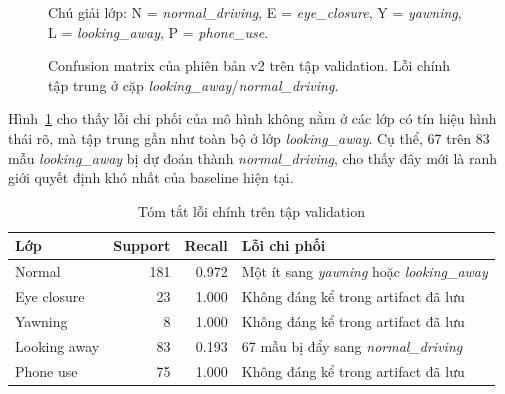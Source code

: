 \documentclass[conference,a4paper]{IEEEtran}
\begin{document}
\begin{figure}[t]
\caption{Confusion matrix của phiên bản v2 trên tập validation. Lỗi chính tập trung ở cặp \textit{looking\_away}/\textit{normal\_driving}.}
\label{fig:confusion-matrix}
\centering
{}

\vspace{0.2em}
{\scriptsize Chú giải lớp: N = \textit{normal\_driving}, E = \textit{eye\_closure}, Y = \textit{yawning}, L = \textit{looking\_away}, P = \textit{phone\_use}.}
\end{figure}

Hình~\ref{fig:confusion-matrix} cho thấy lỗi chi phối của mô hình không nằm ở các lớp có tín hiệu hình thái rõ, mà tập trung gần như toàn bộ ở lớp \textit{looking\_away}. Cụ thể, 67 trên 83 mẫu \textit{looking\_away} bị dự đoán thành \textit{normal\_driving}, cho thấy đây mới là ranh giới quyết định khó nhất của baseline hiện tại.

\begin{table}[t]
\caption{Tóm tắt lỗi chính trên tập validation}
\label{tab:error-summary}
\centering
\small
\begin{tabular}{p{1.45cm}rrp{2.1cm}}
\toprule
Lớp & Support & Recall & Lỗi chi phối \\
\midrule
Normal & 181 & 0.972 & Một ít sang \textit{yawning} hoặc \textit{looking\_away} \\
Eye closure & 23 & 1.000 & Không đáng kể trong artifact đã lưu \\
Yawning & 8 & 1.000 & Không đáng kể trong artifact đã lưu \\
Looking away & 83 & 0.193 & 67 mẫu bị đẩy sang \textit{normal\_driving} \\
Phone use & 75 & 1.000 & Không đáng kể trong artifact đã lưu \\
\bottomrule
\end{tabular}
\end{table}
\end{document}
